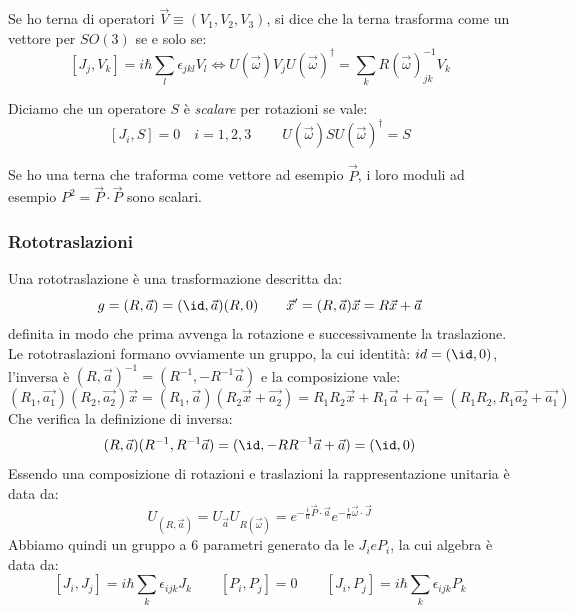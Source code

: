 \begin{definition}
    Se ho terna di operatori \(\vec{V}\equiv (V_1,V_2,V_3)\), si dice che la terna trasforma come un vettore per \(SO(3)\) se e solo se:
    \begin{equation}
        \left[ J_j, V_k  \right]= i\hbar \sum_{l}\epsilon_{jkl}V_l \iff U(\vec{\omega}) V_j U (\vec{\omega})^\dagger = \sum_{k} R(\vec{\omega})^{-1}_{jk}V_k
    \end{equation}
\end{definition}
\begin{definition}
    Diciamo che un operatore \(S\) è \textit{scalare} per rotazioni se vale:
    \begin{equation}
        \left[ J_i,S \right]=0 \quad i = 1,2,3 \qquad \ U(\vec{\omega})S U(\vec{\omega})^{\dagger} = S
    \end{equation}
\end{definition}
\begin{example}
    Se ho una terna che traforma come vettore ad esempio \(\vec{P}\), i loro moduli ad esempio \(P^2 = \vec{P}\cdot \vec{P}\) sono scalari.
\end{example}



\subsubsection{Rototraslazioni}

Una rototraslazione è una trasformazione descritta da:
\begin{equation}
    g = (R, \vec{a})= (\id, \vec{a})(R,0) \qquad \vec{x}'= (R, \vec{a})\vec{x}= R\vec{x}+ \vec{a}
\end{equation}
definita in modo che prima avvenga la rotazione e successivamente la traslazione.\\
Le rototraslazioni formano ovviamente un gruppo, la cui identità: \(id = (\id,0)\), l'inversa è \((R,\vec{a})^{-1}= (R^{-1}, -R^{-1}\vec{a})\) e la composizione vale:
\[
(R_1,\vec{a_1})(R_2, \vec{a_2})\vec{x}= (R _1, \vec{a})(R_2\vec{x}+\vec{a_2})= R_1R_2\vec{x}+ R_1\vec{a}+ \vec{a_1}= (R_1R_2, R_1\vec{a_2}+\vec{a_1})
\]
Che verifica la definizione di inversa:
\[
    (R, \vec{a})(R^{-1}, R^{-1}\vec{a}) = (\id, - RR^{-1}\vec{a}+\vec{a})= (\id,0)
\]
Essendo una composizione di rotazioni e traslazioni la rappresentazione unitaria è data da:
\[
    U_{(R, \vec{a})}= U_{\vec{a}}U_{R(\vec{\omega})}= e^{-\frac{i}{\hbar}\vec{P}\cdot\vec{a}}e^{-\frac{i}{\hbar}\vec{\omega}\cdot\vec{J}}
\]
Abbiamo quindi un gruppo a 6 parametri generato da le \(J_i e P_i\), la cui algebra è data da:
\[
    \left[ J_i, J_j  \right]= i\hbar \sum_k\epsilon_{ijk}J_k \qquad 
    \left[ P_i, P_j \right] =0 \qquad \left[ J_i, P_j\right] = i\hbar \sum_k    \epsilon_{ijk}P_k
\]




